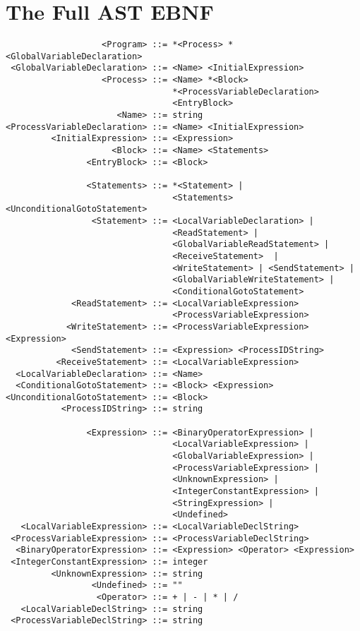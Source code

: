 \chapter{The Full AST EBNF}
\label{app:astebnffull}

\footnotesize
\begin{verbatim}
                   <Program> ::= *<Process> *<GlobalVariableDeclaration>
 <GlobalVariableDeclaration> ::= <Name> <InitialExpression>
                   <Process> ::= <Name> *<Block> 
                                 *<ProcessVariableDeclaration>
                                 <EntryBlock>
                      <Name> ::= string
<ProcessVariableDeclaration> ::= <Name> <InitialExpression>
         <InitialExpression> ::= <Expression>
                     <Block> ::= <Name> <Statements>
                <EntryBlock> ::= <Block>
                
                <Statements> ::= *<Statement> |
                                 <Statements> <UnconditionalGotoStatement>
                 <Statement> ::= <LocalVariableDeclaration> |
                                 <ReadStatement> |
                                 <GlobalVariableReadStatement> |
                                 <ReceiveStatement>  |
                                 <WriteStatement> | <SendStatement> |
                                 <GlobalVariableWriteStatement> |
                                 <ConditionalGotoStatement>
             <ReadStatement> ::= <LocalVariableExpression>
                                 <ProcessVariableExpression>
            <WriteStatement> ::= <ProcessVariableExpression> <Expression>
             <SendStatement> ::= <Expression> <ProcessIDString>
          <ReceiveStatement> ::= <LocalVariableExpression>
  <LocalVariableDeclaration> ::= <Name>
  <ConditionalGotoStatement> ::= <Block> <Expression>
<UnconditionalGotoStatement> ::= <Block>
           <ProcessIDString> ::= string
           
                <Expression> ::= <BinaryOperatorExpression> |
                                 <LocalVariableExpression> |
                                 <GlobalVariableExpression> |
                                 <ProcessVariableExpression> |
                                 <UnknownExpression> |
                                 <IntegerConstantExpression> |
                                 <StringExpression> |
                                 <Undefined>
   <LocalVariableExpression> ::= <LocalVariableDeclString>
 <ProcessVariableExpression> ::= <ProcessVariableDeclString>
  <BinaryOperatorExpression> ::= <Expression> <Operator> <Expression>
 <IntegerConstantExpression> ::= integer
         <UnknownExpression> ::= string
                 <Undefined> ::= ""
                  <Operator> ::= + | - | * | /
   <LocalVariableDeclString> ::= string
 <ProcessVariableDeclString> ::= string
\end{verbatim}
\normalsize
